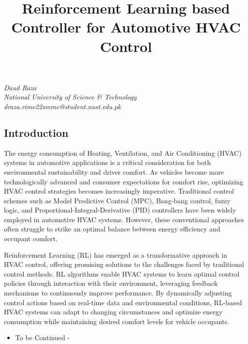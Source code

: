 \documentclass[
]{article}
\title{Reinforcement Learning based Controller for Automotive HVAC
Control}
\author{}
\date{\vspace{-2.5em}}
\providecommand{\tightlist}{%
  \setlength{\itemsep}{0pt}\setlength{\parskip}{0pt}}
\begin{document}
\maketitle

\begin{center}
\textit{Daud Raza} \\
\textit{National University of Science \& Technology} \\
\textit{draza.rime22smme@student.nust.edu.pk} 
\end{center}

\newpage

\tableofcontents

\newpage

\hypertarget{introduction}{%
\subsection{Introduction}\label{introduction}}

The energy consumption of Heating, Ventilation, and Air Conditioning
(HVAC) systems in automotive applications is a critical consideration
for both environmental sustainability and driver comfort. As vehicles
become more technologically advanced and consumer expectations for
comfort rise, optimizing HVAC control strategies becomes increasingly
imperative. Traditional control schemes such as Model Predictive Control
(MPC), Bang-bang control, fuzzy logic, and
Proportional-Integral-Derivative (PID) controllers have been widely
employed in automotive HVAC systems. However, these conventional
approaches often struggle to strike an optimal balance between energy
efficiency and occupant comfort.

Reinforcement Learning (RL) has emerged as a transformative approach in
HVAC control, offering promising solutions to the challenges faced by
traditional control methods. RL algorithms enable HVAC systems to learn
optimal control policies through interaction with their environment,
leveraging feedback mechanisms to continuously improve performance. By
dynamically adjusting control actions based on real-time data and
environmental conditions, RL-based HVAC systems can adapt to changing
circumstances and optimize energy consumption while maintaining desired
comfort levels for vehicle occupants.

\begin{itemize}
\tightlist
\item
  To be Continued -
\end{itemize}
\end{document}
